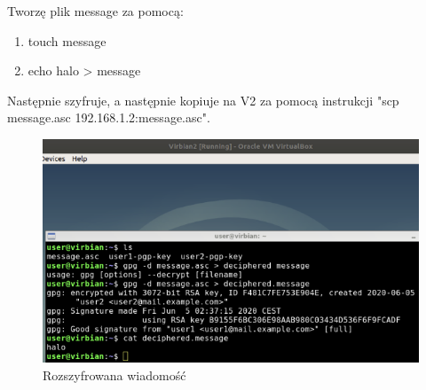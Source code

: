 \documentclass[12pt,a4paper]{article}
\begin{document}
Tworzę plik message za pomocą:
\begin{enumerate}
\item touch message
\item echo halo > message
\end{enumerate}
Następnie szyfruje, a następnie kopiuje na V2 za pomocą instrukcji "scp message.asc 192.168.1.2:message.asc".
\begin{figure}[!htb]
\centering
\includegraphics[scale=0.6]{message.png}
\caption{Rozszyfrowana wiadomość}
\end{figure}
\end{document}
